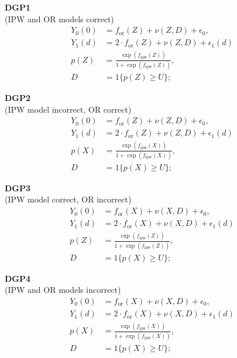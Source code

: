 \begin{multicols}{2}

\textbf{DGP1} \\
(IPW and OR models correct)
\begin{align*}
    Y_0(0) &= f_{\text{or}}(Z) + \nu(Z, D) + \epsilon_0, \\
    Y_1(d) &= 2 \cdot f_{\text{or}}(Z) + \nu(Z, D) + \epsilon_1(d) \\
    p(Z) &= \frac{\exp \left( f_{\text{ipw}}(Z) \right)}{1 + \exp \left( f_{\text{ipw}}(Z) \right)}, \\
    D &= 1\{ p(Z) \geq U \};
\end{align*}

\textbf{DGP2} \\
(IPW model incorrect, OR correct)
\begin{align*}
    Y_0(0) &= f_{\text{or}}(Z) + \nu(Z, D) + \epsilon_0, \\
    Y_1(d) &= 2 \cdot f_{\text{or}}(Z) + \nu(Z, D) + \epsilon_1(d) \\
    p(X) &= \frac{\exp \left( f_{\text{ipw}}(X) \right)}{1 + \exp \left( f_{\text{ipw}}(X) \right)}, \\
    D &= 1\{ p(X) \geq U \};
\end{align*}

\columnbreak

\textbf{DGP3}\\
(IPW model correct, OR incorrect)
\begin{align*}
    Y_0(0) &= f_{\text{or}}(X) + \nu(X, D) + \epsilon_0, \\
    Y_1(d) &= 2 \cdot f_{\text{or}}(X) + \nu(X, D) + \epsilon_1(d) \\
    p(Z) &= \frac{\exp \left( f_{\text{ipw}}(Z) \right)}{1 + \exp \left( f_{\text{ipw}}(Z) \right)}, \\
    D &= 1\{ p(X) \geq U \};
\end{align*}

\textbf{DGP4 } \\
(IPW and OR models incorrect)
\begin{align*}
    Y_0(0) &= f_{\text{or}}(X) + \nu(X, D) + \epsilon_0, \\
    Y_1(d) &= 2 \cdot f_{\text{or}}(X) + \nu(X, D) + \epsilon_1(d) \\
    p(X) &= \frac{\exp \left( f_{\text{ipw}}(X) \right)}{1 + \exp \left( f_{\text{ipw}}(X) \right)}, \\
    D &= 1\{ p(X) \geq U \};
\end{align*}

\end{multicols}

